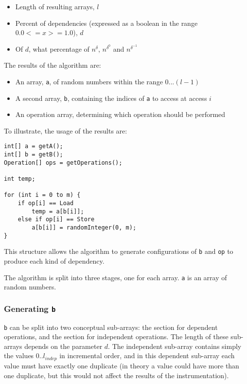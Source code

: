 	\begin{itemize}
		\item Length of resulting arrays, $l$
		\item Percent of dependencies (expressed as a boolean in the range $0.0 <= x >= 1.0$), $d$
		\item Of $d$, what percentage of $n^{\delta}$, $n^{\delta^{0}}$ and $n^{\delta^{-1}}$
	\end{itemize}
	
	The results of the algorithm are:
	
	\begin{itemize}
		\item An array, \texttt{a}, of random numbers within the range $0...(l - 1)$
		\item A second array, \texttt{b}, containing the indices of \texttt{a} to access at access $i$
		\item An operation array, determining which operation should be performed
	\end{itemize}
	
	To illustrate, the usage of the results are:
	
	\begin{lstlisting}
int[] a = getA();
int[] b = getB();
Operation[] ops = getOperations();

int temp;

for (int i = 0 to m) {
    if op[i] == Load
        temp = a[b[i]];
    else if op[i] == Store
        a[b[i]] = randomInteger(0, m);
}\end{lstlisting}

	This structure allows the algorithm to generate configurations of \texttt{b} and \texttt{op} to produce each kind of dependency.
	
	The algorithm is split into three stages, one for each array. \texttt{a} is an array of random numbers.
	
		\subsubsection{Generating \texttt{b}} \label{sec:methodology/params/algo/gen-b}
		\texttt{b} can be split into two conceptual sub-arrays: the section for dependent operations, and the section for independent operations. The length of these sub-arrays depends on the parameter $d$. The independent sub-array contains simply the values $0..l_{indep}$ in incremental order, and in this dependent sub-array each value must have exactly one duplicate (in theory a value could have more than one duplicate, but this would not affect the results of the instrumentation).
		
